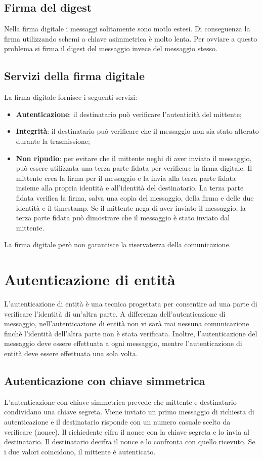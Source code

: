 \documentclass[12pt]{report}
\begin{document}
\subsection{Firma del digest}
Nella firma digitale i messaggi solitamente sono motlo estesi. Di conseguenza la firma utilizzando schemi a chiave asimmetrica è molto lenta. Per ovviare a questo problema si firma il digest del messaggio invece del messaggio stesso. 

\subsection{Servizi della firma digitale}
La firma digitale fornisce i seguenti servizi:
\begin{itemize}
	\item \textbf{Autenticazione}: il destinatario può verificare l'autenticità del mittente;
	\item \textbf{Integrità}: il destinatario può verificare che il messaggio non sia stato alterato durante la trasmissione;
	\item \textbf{Non ripudio}: per evitare che il mittente neghi di aver inviato il messaggio, può essere utilizzata una terza parte fidata per verificare la firma digitale. Il mittente crea la firma per il messaggio e la invia alla terza parte fidata insieme alla propria identità e all'identità del destinatario. La terza parte fidata verifica la firma, salva una copia del messaggio, della firma e delle due identità e il timestamp. Se il mittente nega di aver inviato il messaggio, la terza parte fidata può dimostrare che il messaggio è stato inviato dal mittente.
\end{itemize}
La firma digitale però non garantisce la riservatezza della comunicazione.

\section{Autenticazione di entità}
L'autenticazione di entità è una tecnica progettata per consentire ad una parte di verificare l'identità di un'altra parte. A differenza dell'autenticazione di messaggio, nell'autenticazione di entità non vi sarà mai nessuna comunicazione finchè l'identità dell'altra parte non è stata verificata. Inoltre, l'autenticazione del messaggio deve essere effettuata a ogni messaggio, mentre l'autenticazione di entità deve essere effettuata una sola volta. 

\subsection{Autenticazione con chiave simmetrica}
L'autenticazione con chiave simmetrica prevede che mittente e destinatario condividano una chiave segreta. Viene inviato un primo messaggio di richiesta di autenticazione e il destinatario risponde con un numero casuale scelto da verificare (nonce). Il richiedente cifra il nonce con la chiave segreta e lo invia al destinatario. Il destinatario decifra il nonce e lo confronta con quello ricevuto. Se i due valori coincidono, il mittente è autenticato. 
\end{document}
